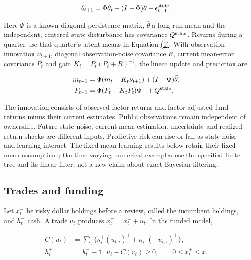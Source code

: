 \documentclass[11pt]{article}
\begin{document}
\begin{equation*}
\theta_{t+1}=\Phi\theta_t+(I-\Phi)\bar\theta+\epsilon^{\rm state}_{t+1}.
\end{equation*}

Here \(\Phi\) is a known diagonal persistence matrix, \(\bar\theta\) a long-run mean and the independent, centered state disturbance has covariance \(Q^{\rm state}\). Returns during a quarter use that quarter's latent means in Equation \hyperref[eq:1]{(1)}. With observation innovation \(\nu_{t+1}\), diagonal observation-noise covariance \(R\), current mean-error covariance \(P_t\) and gain \(K_t=P_t(P_t+R)^{-1}\), the linear update and prediction are

\begin{equation*}
\begin{aligned}
m_{t+1}&=\Phi(m_t+K_t\nu_{t+1})+(I-\Phi)\bar\theta,\\
P_{t+1}&=\Phi(P_t-K_tP_t)\Phi^\top+Q^{\rm state}.
\end{aligned}
\end{equation*}

The innovation consists of observed factor returns and factor-adjusted fund returns minus their current estimates. Public observations remain independent of ownership. Future state noise, current mean-estimation uncertainty and realized-return shocks are different inputs. Predictive risk can rise or fall as state noise and learning interact. The fixed-mean learning results below retain their fixed-mean assumptions; the time-varying numerical examples use the specified finite tree and its linear filter, not a new claim about exact Bayesian filtering.

\subsection{Trades and funding}\label{sec:2.2}

Let \(x^-_t\) be risky dollar holdings before a review, called the incumbent holdings, and \(h^-_t\) cash. A trade \(u_t\) produces \(x^+_t=x^-_t+u_t\). In the funded model,

\begin{equation*}
\begin{aligned}
C(u_t)&=\sum_i\{\kappa_i^+(u_{t,i})^++\kappa_i^-(-u_{t,i})^+\},\\
h^+_t&=h^-_t-\mathbf1^\top u_t-C(u_t)\geq0,\qquad
0\leq x^+_t\leq\bar x.
\end{aligned}
\tag{4}\label{eq:4}
\end{equation*}
\end{document}
